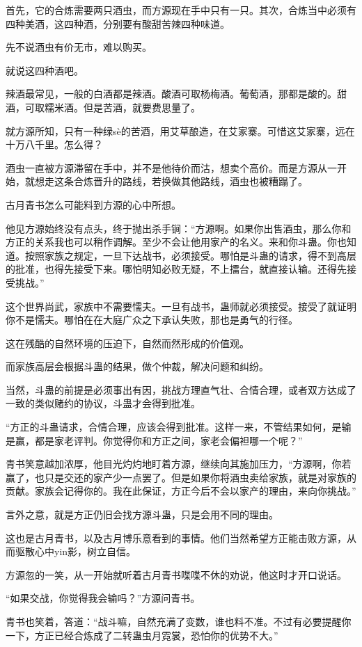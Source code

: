 \begin{this_body}
首先，它的合炼需要两只酒虫，而方源现在手中只有一只。其次，合炼当中必须有四种美酒，这四种酒，分别要有酸甜苦辣四种味道。

先不说酒虫有价无市，难以购买。

就说这四种酒吧。

辣酒最常见，一般的白酒都是辣酒。酸酒可取杨梅酒。葡萄酒，那都是酸的。甜酒，可取糯米酒。但是苦酒，就要费思量了。

就方源所知，只有一种绿sè的苦酒，用艾草酿造，在艾家寨。可惜这艾家寨，远在十万八千里。怎么得？

酒虫一直被方源滞留在手中，并不是他待价而沽，想卖个高价。而是方源从一开始，就想走这条合炼晋升的路线，若换做其他路线，酒虫也被糟蹋了。

古月青书怎么可能料到方源的心中所想。

他见方源始终没有点头，终于抛出杀手锏：“方源啊。如果你出售酒虫，那么你和方正的关系我也可以稍作调解。至少不会让他用家产的名义。来和你斗蛊。你也知道。按照家族之规定，一旦下达战书，必须接受。哪怕是斗蛊的请求，得不到高层的批准，也得先接受下来。哪怕明知必败无疑，不上擂台，就直接认输。还得先接受挑战。”

这个世界尚武，家族中不需要懦夫。一旦有战书，蛊师就必须接受。接受了就证明你不是懦夫。哪怕在在大庭广众之下承认失败，那也是勇气的行径。

这在残酷的自然环境的压迫下，自然而然形成的价值观。

而家族高层会根据斗蛊的结果，做个仲裁，解决问题和纠纷。

当然，斗蛊的前提是必须事出有因，挑战方理直气壮、合情合理，或者双方达成了一致的类似赌约的协议，斗蛊才会得到批准。

“方正的斗蛊请求，合情合理，应该会得到批准。这样一来，不管结果如何，是输是赢，都是家老评判。你觉得你和方正之间，家老会偏袒哪一个呢？”

青书笑意越加浓厚，他目光灼灼地盯着方源，继续向其施加压力，“方源啊，你若赢了，也只是交还的家产少一点罢了。但是如果你将酒虫卖给家族，就是对家族的贡献。家族会记得你的。我在此保证，方正今后不会以家产的理由，来向你挑战。”

言外之意，就是方正仍旧会找方源斗蛊，只是会用不同的理由。

这也是古月青书，以及古月博乐意看到的事情。他们当然希望方正能击败方源，从而驱散心中yin影，树立自信。

方源忽的一笑，从一开始就听着古月青书喋喋不休的劝说，他这时才开口说话。

“如果交战，你觉得我会输吗？”方源问青书。

青书也笑着，答道：“战斗嘛，自然充满了变数，谁也料不准。不过有必要提醒你一下，方正已经合炼成了二转蛊虫月霓裳，恐怕你的优势不大。”


\end{this_body}
